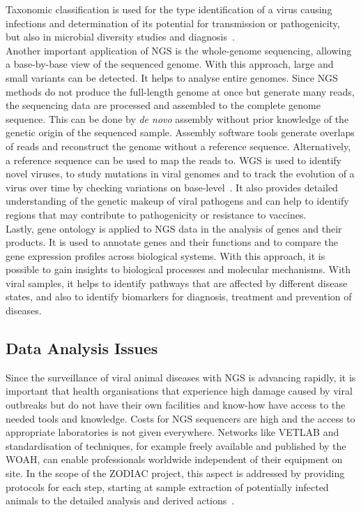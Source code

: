 Taxonomic classification is used for the type identification of a virus causing infections and determination of its potential for transmission or pathogenicity, but also in microbial diversity studies and diagnosis~\cite{dutilh2021perspective}. \\
Another important application of \ac{NGS} is the whole-genome sequencing, allowing a base-by-base view of the sequenced genome. With this approach, large and small variants can be detected. It helps to analyse entire genomes. Since \ac{NGS} methods do not produce the full-length genome at once but generate many reads, the sequencing data are processed and assembled to the complete genome sequence. This can be done by \textit{de novo} assembly without prior knowledge of the genetic origin of the sequenced sample. Assembly software tools generate overlaps of reads and reconstruct the genome without a reference sequence. Alternatively, a reference sequence can be used to map the reads to. \ac{WGS} is used to identify novel viruses, to study mutations in viral genomes and to track the evolution of a virus over time by checking variations on base-level~\cite{slatko2018overview}. It also provides detailed understanding of the genetic makeup of viral pathogens and can help to identify regions that may contribute to pathogenicity or resistance to vaccines. \\
Lastly, gene ontology is applied to \ac{NGS} data in the analysis of genes and their products. It is used to annotate genes and their functions and to compare the gene expression profiles across biological systems. With this approach, it is possible to gain insights to biological processes and molecular mechanisms. With viral samples, it helps to identify pathways that are affected by different disease states, and also to identify biomarkers for diagnosis, treatment and prevention of diseases.

\subsection{Data Analysis Issues}
Since the surveillance of viral animal diseases with \ac{NGS} is advancing rapidly, it is important that health organisations that experience high damage caused by viral outbreaks but do not have their own facilities and know-how have access to the needed tools and knowledge. Costs for \ac{NGS} sequencers are high and the access to appropriate laboratories is not given everywhere. Networks like \ac{VETLAB} and standardisation of techniques, for example freely available and published by the \ac{WOAH}, can enable professionals worldwide independent of their equipment on site. In the scope of the \ac{ZODIAC} project, this aspect is addressed by providing protocols for each step, starting at sample extraction of potentially infected animals to the detailed analysis and derived actions~\cite{zodiac2021}.

